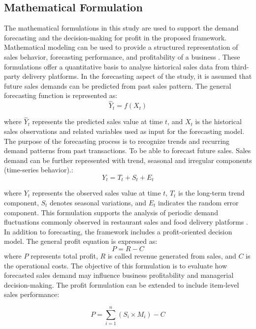 \subsection{Mathematical Formulation}
The mathematical formulations in this study are used to support the demand forecasting and the decision-making for profit in the proposed framework. Mathematical modeling can be used to provide a structured representation of sales behavior, forecasting performance, and profitability of a business \citep{botchkarev2018performanc}. These formulations offer a quantitative basis to analyse historical sales data from third-party delivery platforms. In the forecasting aspect of the study, it is assumed that future sales demands can be predicted from past sales pattern. The general forecasting function is represented as:
\begin{equation}
\hat{Y}_t = f(X_t)
\end{equation}

where $\hat{Y}_t$ represents the predicted sales value at time $t$, and $X_t$ is the historical sales observations and related variables used as input for the forecasting model. The purpose of the forecasting process is to recognize trends and recurring demand patterns from past transactions. To be able to forecast future sales. Sales demand can be further represented with trend, seasonal and irregular components (time-series behavior).:
\begin{equation}
Y_t = T_t + S_t + E_t
\end{equation}

where $Y_t$ represents the observed sales value at time $t$, $T_t$ is the long-term trend component, $S_t$ denotes seasonal variations, and $E_t$ indicates the random error component. This formulation supports the analysis of periodic demand fluctuations commonly observed in restaurant sales and food delivery platforms \citep{chai2014rooc}. In addition to forecasting, the framework includes a profit-oriented
decision model. The general profit equation is expressed as:
\begin{equation}
P = R - C
\end{equation}
where $P$ represents total profit, $R$ is called revenue generated from sales, and $C$ is the operational costs.
The objective of this formulation is to evaluate how forecasted sales demand may influence business profitability and managerial decision-making. The profit formulation can be extended to include item-level sales
performance:

\begin{equation}
P = \sum_{i=1}^{n}(S_i \times M_i) - C
\end{equation}

